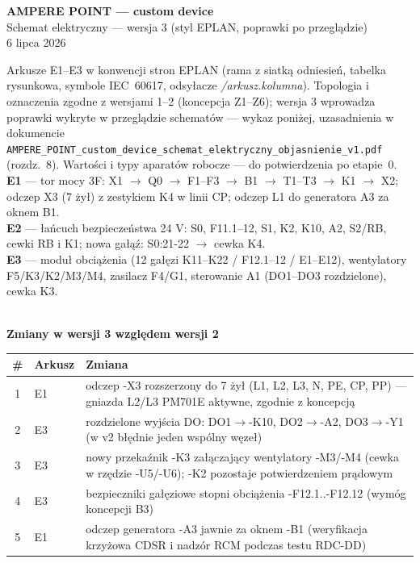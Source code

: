 \documentclass[10pt,a4paper,landscape]{article}
\begin{document}
\begin{center}
\vspace*{1.2cm}
{\LARGE\bfseries AMPERE POINT --- custom device}\\[6pt]
{\Large Schemat elektryczny --- wersja 3 (styl EPLAN, poprawki po przeglądzie)}\\[10pt]
{\normalsize 6 lipca 2026}\\[12pt]
\begin{minipage}{0.86\textwidth}\small
Arkusze E1--E3 w konwencji stron EPLAN (rama z siatką odniesień, tabelka rysunkowa, symbole
IEC~60617, odsyłacze \emph{/arkusz.kolumna}). Topologia i oznaczenia zgodne z wersjami 1--2
(koncepcja Z1--Z6); wersja 3 wprowadza poprawki wykryte w przeglądzie schematów --- wykaz poniżej,
uzasadnienia w dokumencie \texttt{AMPERE\_POINT\_custom\_device\_schemat\_elektryczny\_objasnienie\_v1.pdf}
(rozdz.~8). Wartości i typy aparatów robocze --- do potwierdzenia po etapie~0.\\[6pt]
\textbf{E1} --- tor mocy 3F: X1 $\to$ Q0 $\to$ F1--F3 $\to$ B1 $\to$ T1--T3 $\to$ K1 $\to$ X2;
odczep X3 (7 żył) z zestykiem K4 w linii CP; odczep L1 do generatora A3 za oknem B1.\\
\textbf{E2} --- łańcuch bezpieczeństwa 24 V: S0, F11.1--12, S1, K2, K10, A2, S2/RB, cewki RB i K1;
nowa gałąź: S0:21-22 $\to$ cewka K4.\\
\textbf{E3} --- moduł obciążenia (12 gałęzi K11--K22 / F12.1--12 / E1--E12), wentylatory
F5/K3/K2/M3/M4, zasilacz F4/G1, sterowanie A1 (DO1--DO3 rozdzielone), cewka K3.
\end{minipage}\\[10pt]
{\small\textbf{Zmiany w wersji 3 względem wersji 2}}\\[3pt]
{\scriptsize
\begin{tabular}{clp{11.2cm}}
\toprule
\# & Arkusz & Zmiana\\
\midrule
1 & E1 & odczep -X3 rozszerzony do 7 żył (L1, L2, L3, N, PE, CP, PP) --- gniazda L2/L3 PM701E aktywne, zgodnie z koncepcją\\
2 & E3 & rozdzielone wyjścia DO: DO1$\to$-K10, DO2$\to$-A2, DO3$\to$-Y1 (w v2 błędnie jeden wspólny węzeł)\\
3 & E3 & nowy przekaźnik -K3 załączający wentylatory -M3/-M4 (cewka w rzędzie -U5/-U6); -K2 pozostaje potwierdzeniem prądowym\\
4 & E3 & bezpieczniki gałęziowe stopni obciążenia -F12.1..-F12.12 (wymóg koncepcji B3)\\
5 & E1 & odczep generatora -A3 jawnie za oknem -B1 (weryfikacja krzyżowa CDSR i nadzór RCM podczas testu RDC-DD)\\

\end{tabular}}
\end{center}
\end{document}
